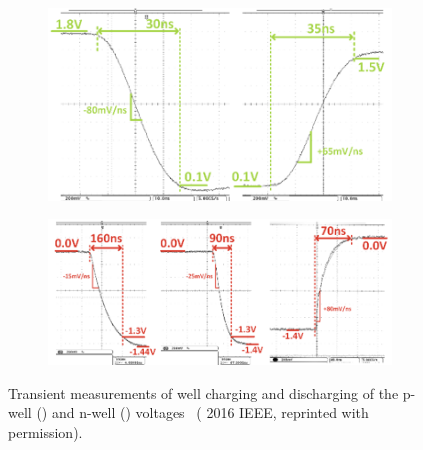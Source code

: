 \documentclass[graybox]{svmult}
\begin{document}
\begin{figure}
  \centering
  \begin{subfigure}[t]{\textwidth}
  \centering
  \includegraphics[width=\textwidth]{bbgen-results-transient-a}
  \caption{}
  \label{fig:bbgen-results-transient-a}
  \end{subfigure}
  \par\bigskip
  \begin{subfigure}[t]{\textwidth}
  \centering
  \includegraphics[width=\textwidth]{bbgen-results-transient-b}
  \caption{}
  \label{fig:bbgen-results-transient-b}
  \end{subfigure}
  \caption{Transient measurements of well charging and discharging of the p-well () and n-well () voltages~\cite{Blagojevic2016} ({\textcopyright} 2016 IEEE, reprinted with permission).}
  \label{fig:bbgen-results-transient}
\end{figure}
\end{document}
